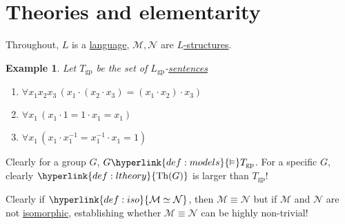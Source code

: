 \documentclass{article}
\let\models\vDash
\DeclareMathOperator{\Mod}{Mod}
\DeclareMathOperator{\Th}{Th}
\newtheorem{nexample}[nthm]{Example}
\newcommand{\named}[1]{\textbf{#1}\index{#1}}
\begin{document}
\clearpage
\section{Theories and elementarity}
Throughout, $L$ is a \hyperlink{def:lang}{language}, $\mathcal{M}, \mathcal{N}$ are \hyperlink{def:str}{$L$-structures}.
\begin{nexample}\label{eg:3.2}
  Let $T_{\text{gp}}$ be the set of \hyperlink{def:lgp}{$L_{\text{gp}}$}-\hyperlink{def:sentence}{sentences}
  \begin{enumerate}[label=(\roman*)]
    \item $\forall x_1 x_2 x_3\, (x_1 \cdot (x_2 \cdot x_3) = (x_1 \cdot x_2) \cdot x_3)$
    \item $\forall x_1\, (x_1 \cdot 1 = 1 \cdot x_1 = x_1)$
    \item $\forall x_1\,(x_1 \cdot x_1^{-1} = x_1^{-1} \cdot x_1 = 1)$
  \end{enumerate}
\end{nexample}
Clearly for a group $G$, $G \hyperlink{def:models}{\models} T_{\text{gp}}$. For a specific $G$, clearly $\hyperlink{def:ltheory}{\Th(G)}$ is larger than $T_{\text{gp}}$!

Clearly if $\hyperlink{def:iso}{\mathcal{M} \simeq \mathcal{N}}$, then \hyperlink{def:eleq}{$\mathcal{M} \equiv \mathcal{N}$} but if $\mathcal{M}$ and $\mathcal{N}$ are not \hyperlink{def:iso}{isomorphic}, establishing whether $\mathcal{M} \equiv \mathcal{N}$ can be highly non-trivial!
\end{document}
